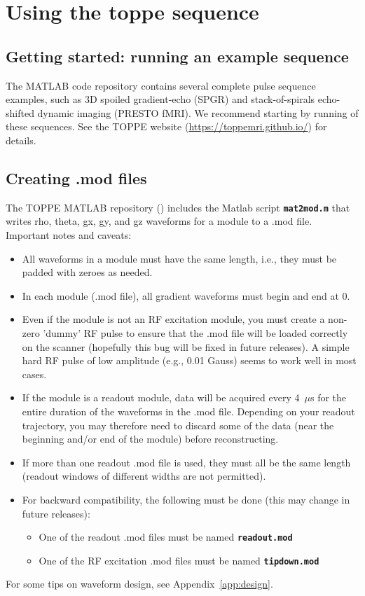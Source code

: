 
\chapter{Using the toppe sequence}

\section{Getting started: running an example sequence}

The MATLAB code repository contains several complete pulse sequence examples, such as 3D spoiled gradient-echo (SPGR) and stack-of-spirals echo-shifted dynamic imaging (PRESTO fMRI). 
We recommend starting by running of these sequences.
See the TOPPE website (\url{https://toppemri.github.io/}) for details.



\section{Creating .mod files}
\label{sec:cmf}
The TOPPE MATLAB repository (\matrep) includes the Matlab script {\tt \bf mat2mod.m} that writes rho, theta, gx, gy, and gz waveforms for a module to a .mod file.
Important notes and caveats:
\begin{itemize}
	\item All waveforms in a module must have the same length, i.e., they must be padded with zeroes as needed.
	\item In each module (.mod file), all gradient waveforms must begin and end at 0.
	\item Even if the module is not an RF excitation module, you must create a non-zero 'dummy' RF pulse to ensure that the .mod file will be loaded correctly on the scanner (hopefully this bug will be fixed in future releases). A simple hard RF pulse of low amplitude (e.g., 0.01 Gauss) seems to work well in most cases.
	\item If the module is a readout module, data will be acquired every 4~$\mu$s for the entire duration of the waveforms in the .mod file. Depending on your readout trajectory, you may therefore need to discard some of the data (near the beginning and/or end of the module) before reconstructing.
	\item If more than one readout .mod file is used, they must all be the same length (readout windows of different widths are not permitted).
	\item For backward compatibility, the following must be done (this may change in future releases):
	\begin{itemize}
		\item One of the readout .mod files must be named {\tt \bf readout.mod} 
		\item One of the RF excitation .mod files must be named {\tt \bf tipdown.mod} 
	\end{itemize}
\end{itemize}
For some tips on waveform design, see Appendix~\ref{app:design}.


